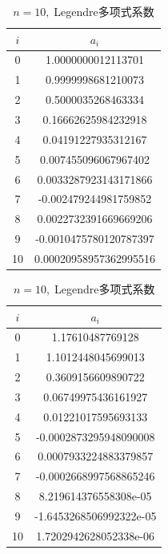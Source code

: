 \documentclass[UTF8,ctexart,a4paper,11pt,openany]{article}
\theoremstyle{definition}
\begin{document}
    \begin{table}[H]
        \centering
        \begin{minipage}{0.45\linewidth}
            \centering
            \begin{tabular}{|c|c|}
            
    \hline
            $i$ & $a_i$ \\
            \hline
            0 & 1.0000000012113701 \\
            \hline
            1 & 0.9999998681210073 \\
            \hline
            2& 0.5000035268463334\\
            \hline
            3& 0.16662625984232918 \\
            \hline
            4& 0.04191227935312167\\
            \hline
            5& 0.007455096067967402\\
            \hline
            6& 0.0033287923143171866\\
            \hline
            7& -0.002479244981759852\\
            \hline
            8& 0.0022732391669669206 \\
            \hline
            9& -0.0010475780120787397 \\
            \hline
            10& 0.00020958957362995516\\
            \hline
            \end{tabular}
            \caption{$n=10,\;\varphi_i(x)=x^i$系数}
        \end{minipage}
        \hfill
        \begin{minipage}{0.45\linewidth}
            \centering
            \begin{tabular}{|c|c|}
        \hline
        $i$ &$a_i$\\
        \hline
        0& 1.17610487769128 \\
        \hline
        1& 1.1012448045699013 \\
        \hline
        2& 0.3609156609890722 \\
        \hline
        3& 0.06749975436161927 \\
        \hline
        4& 0.01221017595693133 \\
        \hline
        5& -0.0002873295948090008\\
        \hline
        6& 0.0007933224883379857 \\
        \hline
        7& -0.0002668997568865246\\
    \hline
        8& 8.219614376558308e-05\\
        \hline
        9& -1.6453268506992322e-05 \\
        \hline
        10& 1.7202942628052338e-06\\
        \hline
            \end{tabular}
            \caption{$n=10,\;$Legendre多项式系数}
            \end{minipage}
    \end{table}
\end{document}

